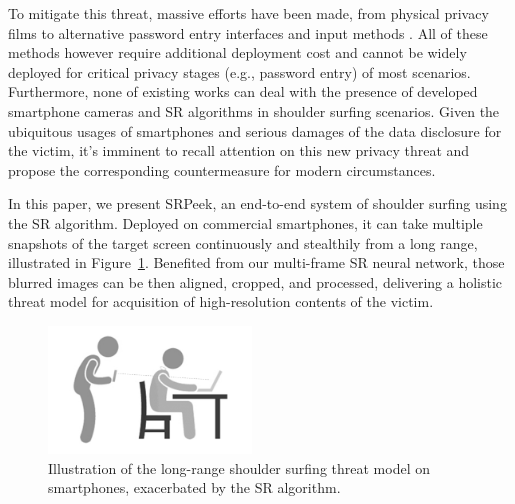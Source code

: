 
To mitigate this threat, massive efforts have been made, from physical privacy films to alternative password entry interfaces \cite{wiedenbeck2006design,papadopoulos2017illusionpin} and input methods \cite{kumar2007reducing}. All of these methods however require additional deployment cost \cite{Chun2019Keep} and cannot be widely deployed for critical privacy stages (e.g., password entry) of most scenarios. Furthermore, none of existing works can deal with the presence of developed smartphone cameras and SR algorithms in shoulder surfing scenarios. Given the ubiquitous usages of smartphones and serious damages of the data disclosure for the victim, it's imminent to recall attention on this new privacy threat and propose the corresponding countermeasure for modern circumstances.

In this paper, we present \textsf{SRPeek}, an end-to-end system of shoulder surfing using the SR algorithm. Deployed on commercial smartphones, it can take multiple snapshots of the target screen continuously and stealthily from a long range, illustrated in Figure~\ref{illustration_of_system}. Benefited from our multi-frame SR neural network, those blurred images can be then aligned, cropped, and processed, delivering a holistic threat model for acquisition of high-resolution contents of the victim.

\begin{figure}
	\centering
	\includegraphics[width=0.48\textwidth]{pic/intro.png}
    \caption{Illustration of the long-range shoulder surfing threat model on smartphones, exacerbated by the SR algorithm. }
	\label{illustration_of_system}
\end{figure}

